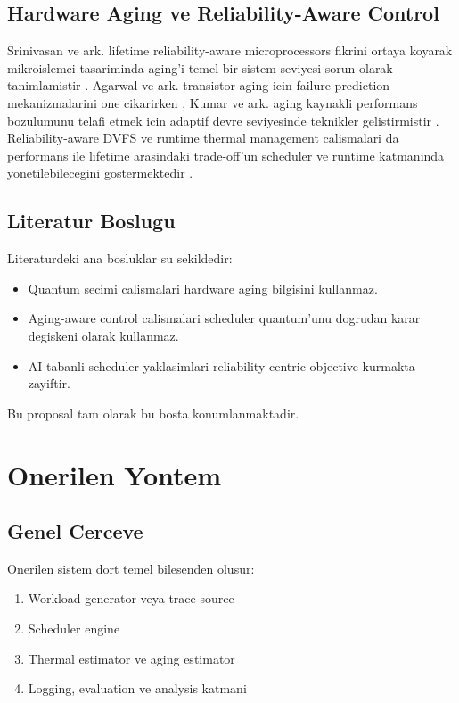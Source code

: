 \documentclass[12pt,a4paper]{article}
\begin{document}
\subsection{Hardware Aging ve Reliability-Aware Control}

Srinivasan ve ark. lifetime reliability-aware microprocessors fikrini ortaya koyarak mikroislemci tasariminda
aging'i temel bir sistem seviyesi sorun olarak tanimlamistir \cite{srinivasan2004}. Agarwal ve ark. transistor aging
icin failure prediction mekanizmalarini one cikarirken \cite{agarwal2007}, Kumar ve ark. aging kaynakli performans
bozulumunu telafi etmek icin adaptif devre seviyesinde teknikler gelistirmistir \cite{kumar2011}. Reliability-aware
DVFS ve runtime thermal management calismalari da performans ile lifetime arasindaki trade-off'un scheduler ve runtime
katmaninda yonetilebilecegini gostermektedir \cite{aydin2009,yeganeh2021}.

\subsection{Literatur Boslugu}

Literaturdeki ana bosluklar su sekildedir:

\begin{itemize}[leftmargin=*]
\item Quantum secimi calismalari hardware aging bilgisini kullanmaz.
\item Aging-aware control calismalari scheduler quantum'unu dogrudan karar degiskeni olarak kullanmaz.
\item AI tabanli scheduler yaklasimlari reliability-centric objective kurmakta zayiftir.
\end{itemize}

Bu proposal tam olarak bu bosta konumlanmaktadir.

\section{Onerilen Yontem}

\subsection{Genel Cerceve}

Onerilen sistem dort temel bilesenden olusur:

\begin{enumerate}[leftmargin=*]
\item Workload generator veya trace source
\item Scheduler engine
\item Thermal estimator ve aging estimator
\item Logging, evaluation ve analysis katmani
\end{enumerate}
\end{document}
